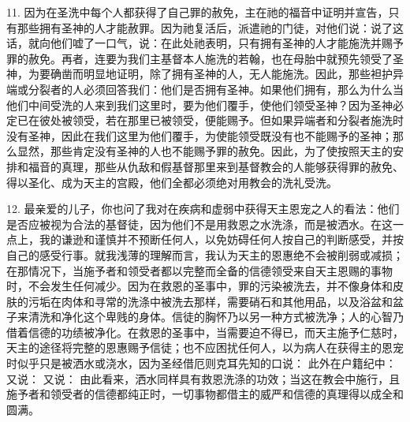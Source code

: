 11. 因为在圣洗中每个人都获得了自己罪的赦免，主在祂的福音中证明并宣告，只有那些拥有圣神的人才能赦罪。因为祂复活后，派遣祂的门徒，对他们说：说了这话，就向他们嘘了一口气，说：在此处祂表明，只有拥有圣神的人才能施洗并赐予罪的赦免。再者，连要为我们主基督本人施洗的若翰，也在母胎中就预先领受了圣神，为要确凿而明显地证明，除了拥有圣神的人，无人能施洗。因此，那些袒护异端或分裂者的人必须回答我们：他们是否拥有圣神。如果他们拥有，那么为什么当他们中间受洗的人来到我们这里时，要为他们覆手，使他们领受圣神？因为圣神必定已在彼处被领受，若在那里已被领受，便能赐予。但如果异端者和分裂者施洗时没有圣神，因此在我们这里为他们覆手，为使能领受既没有也不能赐予的圣神；那么显然，那些肯定没有圣神的人也不能赐予罪的赦免。因此，为了使按照天主的安排和福音的真理，那些从仇敌和假基督那里来到基督教会的人能够获得罪的赦免、得以圣化、成为天主的宫殿，他们全都必须绝对用教会的洗礼受洗。\par

12. 最亲爱的儿子，你也问了我对在疾病和虚弱中获得天主恩宠之人的看法：他们是否应被视为合法的基督徒，因为他们不是用救恩之水洗涤，而是被洒水。在这一点上，我的谦逊和谨慎并不预断任何人，以免妨碍任何人按自己的判断感受，并按自己的感受行事。就我浅薄的理解而言，我认为天主的恩惠绝不会被削弱或减损；在那情况下，当施予者和领受者都以完整而全备的信德领受来自天主恩赐的事物时，不会发生任何减少。因为在救恩的圣事中，罪的污染被洗去，并不像身体和皮肤的污垢在肉体和寻常的洗涤中被洗去那样，需要硝石和其他用品，以及浴盆和盆子来清洗和净化这个卑贱的身体。信徒的胸怀乃以另一种方式被洗净；人的心智乃借着信德的功绩被净化。在救恩的圣事中，当需要迫不得已，而天主施予仁慈时，天主的途径将完整的恩惠赐予信徒；也不应困扰任何人，以为病人在获得主的恩宠时似乎只是被洒水或浇水，因为圣经借厄则克耳先知的口说： 此外在户籍纪中：又说： 又说： 由此看来，洒水同样具有救恩洗涤的功效；当这在教会中施行，且施予者和领受者的信德都纯正时，一切事物都借主的威严和信德的真理得以成全和圆满。\par

